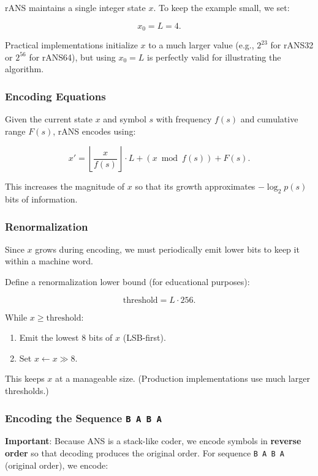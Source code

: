 rANS maintains a single integer state $x$.  
To keep the example small, we set:

\[
x_0 = L = 4.
\]

Practical implementations initialize $x$ to a much larger value (e.g., $2^{23}$ for rANS32 or $2^{56}$ for rANS64), but using $x_0=L$ is perfectly valid for illustrating the algorithm.

\subsubsection{Encoding Equations}

Given the current state $x$ and symbol $s$ with frequency $f(s)$ and cumulative range $F(s)$, rANS encodes using:

\[
x' = \left\lfloor \frac{x}{f(s)} \right\rfloor \cdot L + (x \bmod f(s)) + F(s).
\]

This increases the magnitude of $x$ so that its growth approximates $-\log_2 p(s)$ bits of information.

\subsubsection{Renormalization}

Since $x$ grows during encoding, we must periodically emit lower bits to keep it within a machine word.

Define a renormalization lower bound (for educational purposes):

\[
\text{threshold} = L \cdot 256.
\]

While $x \geq \text{threshold}$:

\begin{enumerate}
    \item Emit the lowest 8 bits of $x$ (LSB-first).
    \item Set $x \leftarrow x \gg 8$.
\end{enumerate}

This keeps $x$ at a manageable size. (Production implementations use much larger thresholds.)

\subsubsection{Encoding the Sequence \texttt{B A B A}}

\textbf{Important}: Because ANS is a stack-like coder, we encode symbols in \textbf{reverse order} so that decoding produces the original order. For sequence \texttt{B A B A} (original order), we encode:

